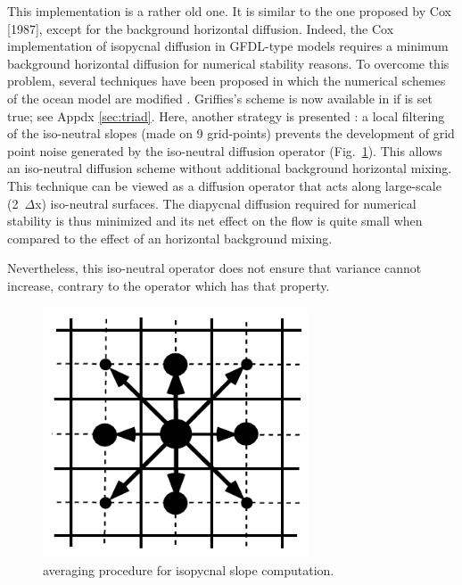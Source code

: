 {This implementation is a rather old one. It is similar to the one
proposed by Cox [1987], except for the background horizontal
diffusion. Indeed, the Cox implementation of isopycnal diffusion in
GFDL-type models requires a minimum background horizontal diffusion
for numerical stability reasons.  To overcome this problem, several
techniques have been proposed in which the numerical schemes of the
ocean model are modified \citep{Weaver_Eby_JPO97,
  Griffies_al_JPO98}. Griffies's scheme is now available in \NEMO if
 is set true; see Appdx \ref{sec:triad}. Here,
another strategy is presented \citep{Lazar_PhD97}: a local
filtering of the iso-neutral slopes (made on 9 grid-points) prevents
the development of grid point noise generated by the iso-neutral
diffusion operator (Fig.~\ref{Fig_LDF_ZDF1}). This allows an
iso-neutral diffusion scheme without additional background horizontal
mixing. This technique can be viewed as a diffusion operator that acts
along large-scale (2~$\Delta$x)  iso-neutral surfaces. The diapycnal diffusion required
for numerical stability is thus minimized and its net effect on the
flow is quite small when compared to the effect of an horizontal
background mixing.

Nevertheless, this iso-neutral operator does not ensure that variance cannot increase, 
contrary to the \citet{Griffies_al_JPO98} operator which has that property. 

\begin{figure}[!ht]      \begin{center}
\includegraphics[width=0.70\textwidth]{./TexFiles/Figures/Fig_LDF_ZDF1.pdf}
\caption {    \label{Fig_LDF_ZDF1}
averaging procedure for isopycnal slope computation.}
\end{center}    \end{figure}

}

